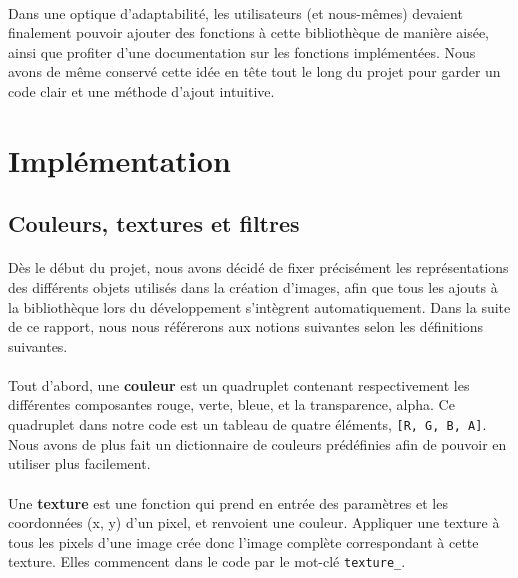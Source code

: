 \documentclass[a4paper]{article}
\begin{document}
\paragraph{}
Dans une optique d'adaptabilité, les utilisateurs (et nous-mêmes) devaient finalement pouvoir ajouter des fonctions à cette bibliothèque de manière aisée, ainsi que profiter d'une documentation sur les fonctions implémentées. Nous avons de même conservé cette idée en tête tout le long du projet pour garder un code clair et une méthode d'ajout intuitive.



\section{Implémentation}

\subsection{Couleurs, textures et filtres}
\label{sec:colors}

\paragraph{}
Dès le début du projet, nous avons décidé de fixer précisément les représentations des différents objets utilisés dans la création d'images, afin que tous les ajouts à la bibliothèque lors du développement s'intègrent automatiquement. Dans la suite de ce rapport, nous nous référerons aux notions suivantes selon les définitions suivantes.

\paragraph{} 
Tout d'abord, une \textbf{couleur} est un quadruplet contenant respectivement les différentes composantes rouge, verte, bleue, et la transparence, alpha. Ce quadruplet dans notre code est un tableau de quatre éléments, \texttt{[R, G, B, A]}. Nous avons de plus fait un dictionnaire de couleurs prédéfinies afin de pouvoir en utiliser plus facilement.

\paragraph{}
Une \textbf{texture} est une fonction qui prend en entrée des paramètres et les coordonnées (x, y) d'un pixel, et renvoient une couleur. Appliquer une texture à tous les pixels d'une image crée donc l'image complète correspondant à cette texture. Elles commencent dans le code par le mot-clé \texttt{texture\_}.
\end{document}
